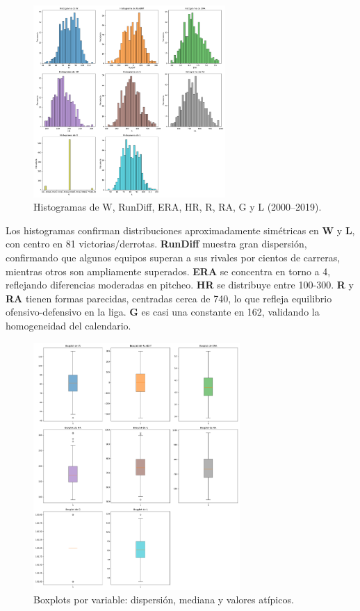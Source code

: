 \documentclass[man,floatsintext]{apa7}
\begin{document}
\begin{figure}[H]
    \centering
    \includegraphics[width=0.65\textwidth]{../plots/final_version/all_histograms.png}
    \caption{Histogramas de W, RunDiff, ERA, HR, R, RA, G y L (2000--2019).}
\end{figure}

Los histogramas confirman distribuciones aproximadamente simétricas en \textbf{W} y \textbf{L}, con centro en 81 victorias/derrotas. 
\textbf{RunDiff} muestra gran dispersión, confirmando que algunos equipos superan a sus rivales por cientos de carreras, mientras otros son ampliamente superados. 
\textbf{ERA} se concentra en torno a 4, reflejando diferencias moderadas en pitcheo. 
\textbf{HR} se distribuye entre 100-300.
\textbf{R} y \textbf{RA} tienen formas parecidas, centradas cerca de 740, lo que refleja equilibrio ofensivo-defensivo en la liga. 
\textbf{G} es casi una constante en 162, validando la homogeneidad del calendario.

\begin{figure}[H]
    \centering
    \includegraphics[width=0.7\textwidth]{../plots/final_version/all_boxplots.png}
    \caption{Boxplots por variable: dispersión, mediana y valores atípicos.}
\end{figure}
\end{document}
